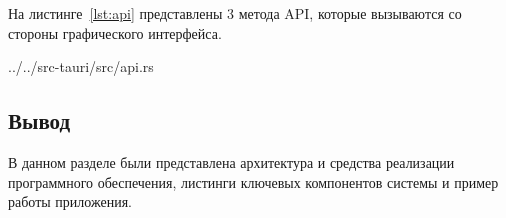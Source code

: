 На листинге~\ref{lst:api} представлены 3 метода API, которые вызываются со стороны графического интерфейса.
\begin{lstinputlisting}[
        caption={Методы API.},
        label={lst:api},
        language={rust},
        style={rustlang},
        linerange={16-100}
    ]{../../src-tauri/src/api.rs}
\end{lstinputlisting}

\subsection*{Вывод}
В данном разделе были представлена архитектура и средства реализации программного обеспечения, листинги ключевых компонентов системы и пример работы приложения.


